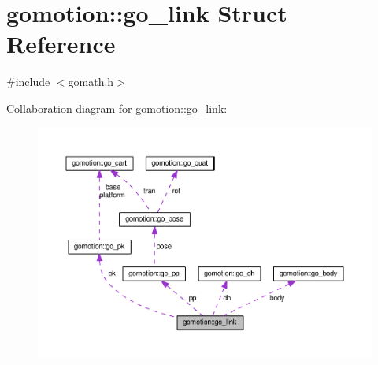 \hypertarget{structgomotion_1_1go__link}{\section{gomotion\-:\-:go\-\_\-link Struct Reference}
\label{structgomotion_1_1go__link}
}


{\ttfamily \#include $<$gomath.\-h$>$}



Collaboration diagram for gomotion\-:\-:go\-\_\-link\-:\nopagebreak
\begin{figure}[H]
\begin{center}
\leavevmode
\includegraphics[width=350pt]{d1/de8/structgomotion_1_1go__link__coll__graph}
\end{center}
\end{figure}
